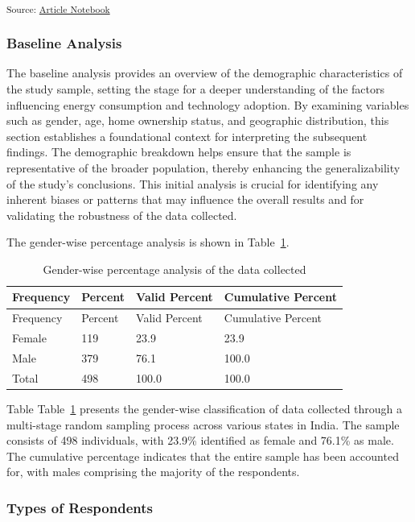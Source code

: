 \documentclass[
  letterpaper,
  DIV=11,
  numbers=noendperiod]{scrartcl}
\begin{document}
\textsubscript{Source:
\href{https://sijuswamyresearch.github.io/SM-project/index-preview.html}{Article
Notebook}}

\subsubsection{Baseline Analysis}\label{baseline-analysis}

The baseline analysis provides an overview of the demographic
characteristics of the study sample, setting the stage for a deeper
understanding of the factors influencing energy consumption and
technology adoption. By examining variables such as gender, age, home
ownership status, and geographic distribution, this section establishes
a foundational context for interpreting the subsequent findings. The
demographic breakdown helps ensure that the sample is representative of
the broader population, thereby enhancing the generalizability of the
study's conclusions. This initial analysis is crucial for identifying
any inherent biases or patterns that may influence the overall results
and for validating the robustness of the data collected.

The gender-wise percentage analysis is shown in Table~\ref{tbl-gender}.

\begin{longtable}[]{@{}llll@{}}
\caption{Gender-wise percentage analysis of the data
collected}\label{tbl-gender}\tabularnewline
\toprule\noalign{}
Frequency & Percent & Valid Percent & Cumulative Percent \\
\midrule\noalign{}
\endfirsthead
\toprule\noalign{}
Frequency & Percent & Valid Percent & Cumulative Percent \\
\midrule\noalign{}
\endhead
\bottomrule\noalign{}
\endlastfoot
Female & 119 & 23.9 & 23.9 \\
Male & 379 & 76.1 & 100.0 \\
Total & 498 & 100.0 & 100.0 \\
\end{longtable}

Table Table~\ref{tbl-gender} presents the gender-wise classification of
data collected through a multi-stage random sampling process across
various states in India. The sample consists of 498 individuals, with
23.9\% identified as female and 76.1\% as male. The cumulative
percentage indicates that the entire sample has been accounted for, with
males comprising the majority of the respondents.

\subsubsection{Types of Respondents}\label{types-of-respondents}
\end{document}
